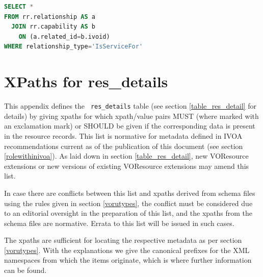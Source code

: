 \documentclass[11pt,a4paper]{ivoa}
\newcommand{\rtent}[1]{\texttt{\color{rtcolor} #1}}
\begin{document}
\begin{lstlisting}[language=SQL,flexiblecolumns=true]
SELECT * 
FROM rr.relationship AS a
  JOIN rr.capability AS b 
    ON (a.related_id=b.ivoid) 
WHERE relationship_type='IsServiceFor'
\end{lstlisting}




\appendix

\section{XPaths for res\_details}

\label{d_u_list}

This appendix defines the \rtent{res\_details}
table (see section \ref{table_res_detail} for
details) by giving
xpaths for which xpath/value pairs MUST (where marked with an
exclamation mark) or SHOULD be given if the
corresponding data is present in the resource records.  This list is
normative for metadata defined in IVOA recommendations current as of the
publication of this document (see section \ref{rolewithinivoa}).  
As laid down in section \ref{table_res_detail}, 
new VOResource extensions or new
versions of existing VOResource extensions may amend this list.

In case there are conflicts between this list and xpaths derived 
from schema files using the rules given in section \ref{vorutypes}, the conflict must be considered due to an
editorial oversight in the preparation of this list, and the xpaths from the
schema files are normative.  Errata to this list will be issued in such
cases.

The xpaths are sufficient for locating the respective metadata as per
section \ref{vorutypes}.  With the explanations we
give the canonical prefixes for the XML namespaces from which the items
originate, which is where further information can be found.
\end{document}
